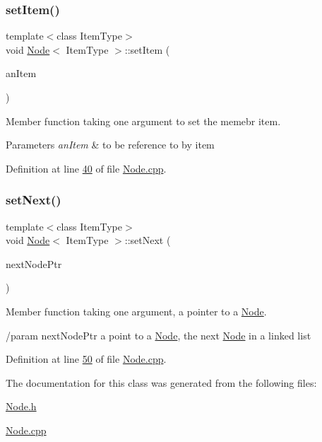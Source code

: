 \mbox{\label{classNode_ab4ceecdecc5df799011de486b9f54974}} 
\subsubsection{\texorpdfstring{set\+Item()}{setItem()}}
{\footnotesize\ttfamily template$<$class Item\+Type$>$ \\
void \hyperlink{classNode}{Node}$<$ Item\+Type $>$\+::set\+Item (\begin{DoxyParamCaption}\item[{const Item\+Type \&}]{an\+Item }\end{DoxyParamCaption})}



Member function taking one argument to set the memebr item. 


\begin{DoxyParams}{Parameters}
{\em an\+Item} & to be reference to by item \\
\hline
\end{DoxyParams}


Definition at line \hyperlink{Node_8cpp_source_l00040}{40} of file \hyperlink{Node_8cpp_source}{Node.\+cpp}.

\mbox{\label{classNode_a01c1a66d4e39f5b149e090413deb4633}} 
\subsubsection{\texorpdfstring{set\+Next()}{setNext()}}
{\footnotesize\ttfamily template$<$class Item\+Type$>$ \\
void \hyperlink{classNode}{Node}$<$ Item\+Type $>$\+::set\+Next (\begin{DoxyParamCaption}\item[{\hyperlink{classNode}{Node}$<$ Item\+Type $>$ $\ast$}]{next\+Node\+Ptr }\end{DoxyParamCaption})}



Member function taking one argument, a pointer to a \hyperlink{classNode}{Node}. 

/param next\+Node\+Ptr a point to a \hyperlink{classNode}{Node}, the next \hyperlink{classNode}{Node} in a linked list 

Definition at line \hyperlink{Node_8cpp_source_l00050}{50} of file \hyperlink{Node_8cpp_source}{Node.\+cpp}.



The documentation for this class was generated from the following files\+:\begin{DoxyCompactItemize}
\item 
\hyperlink{Node_8h}{Node.\+h}\item 
\hyperlink{Node_8cpp}{Node.\+cpp}\end{DoxyCompactItemize}

